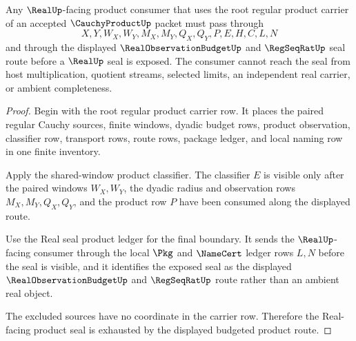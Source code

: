\begin{theorem}
\label{thm:cauchy-product-root-regular-product-budget-seal-exhaustion}
Any $\RealUp$-facing product consumer that uses the root regular product carrier of an accepted $\CauchyProductUp$ packet must pass through
$$
X,Y,W_X,W_Y,M_X,M_Y,Q_X,Q_Y,P,E,H,C,L,N
$$
and through the displayed $\RealObservationBudgetUp$ and $\RegSeqRatUp$ seal route before a $\RealUp$ seal is exposed. The consumer cannot reach the seal from host multiplication, quotient streams, selected limits, an independent real carrier, or ambient completeness.
\end{theorem}
\begin{proof}
Begin with the root regular product carrier row. It places the paired regular Cauchy sources, finite windows, dyadic budget rows, product observation, classifier row, transport rows, route rows, package ledger, and local naming row in one finite inventory.

Apply the shared-window product classifier. The classifier $E$ is visible only after the paired windows $W_X,W_Y$, the dyadic radius and observation rows $M_X,M_Y,Q_X,Q_Y$, and the product row $P$ have been consumed along the displayed route.

Use the Real seal product ledger for the final boundary. It sends the $\RealUp$-facing consumer through the local $\Pkg$ and $\NameCert$ ledger rows $L,N$ before the seal is visible, and it identifies the exposed seal as the displayed $\RealObservationBudgetUp$ and $\RegSeqRatUp$ route rather than an ambient real object.

The excluded sources have no coordinate in the carrier row. Therefore the Real-facing product seal is exhausted by the displayed budgeted product route.
\end{proof}

